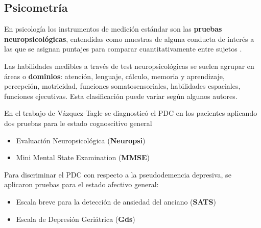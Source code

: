 
\subsection{Psicometría}

En psicología los instrumentos de medición estándar son las \textbf{pruebas neuropsicológicas}, 
entendidas como muestras de alguna conducta de interés a las que se asignan puntajes para comparar 
cuantitativamente entre sujetos \cite{Ardila12}.

Las habilidades medibles a través de test neuropsicológicas se suelen agrupar en áreas o 
\textbf{dominios}: atención, lenguaje, cálculo, memoria y aprendizaje, percepción, motricidad, 
funciones somatosensoriales, habilidades espaciales, funciones ejecutivas. Esta clasificación puede
variar según algunos autores.
%
%

En el trabajo de Vázquez-Tagle \cite{VazquezTagle16} se diagnosticó el PDC en los pacientes 
aplicando dos pruebas para le estado cognoscitivo general
%
\begin{itemize}
\item {Evaluación Neuropsicológica (\textbf{Neuropsi})} \cite{Solis03}
\item {Mini Mental State Examination (\textbf{MMSE})} \cite{Velasco15}
\end{itemize}
%

Para discriminar el PDC con respecto a la pseudodemencia depresiva, se aplicaron pruebas para el
estado afectivo general:
%
\begin{itemize}
\item {Escala breve para la detección de ansiedad del anciano (\textbf{SATS})} \cite{Vargas11}
\item {Escala de Depresión Geriátrica (\textbf{Gds})} \cite{Greenberg12,Cuijpers13}
\end{itemize}

